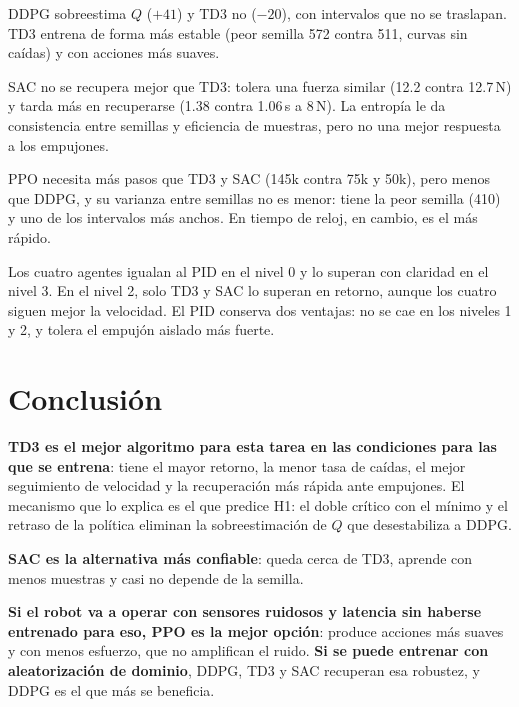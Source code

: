 \documentclass[11pt,a4paper]{article}
\newcommand{\SI}[2]{#1\,#2}  %
\begin{document}
\begin{description}[font=\normalfont\bfseries]
  \item[H1 --- se confirma.] DDPG sobreestima $Q$ ($+41$) y TD3 no ($-20$), con intervalos que no se traslapan. TD3 entrena de forma más estable (peor semilla 572 contra 511, curvas sin caídas) y con acciones más suaves.
  \item[H2 --- se rechaza.] SAC no se recupera mejor que TD3: tolera una fuerza similar (12.2 contra \SI{12.7}{N}) y tarda más en recuperarse (1.38 contra \SI{1.06}{s} a \SI{8}{N}). La entropía le da consistencia entre semillas y eficiencia de muestras, pero no una mejor respuesta a los empujones.
  \item[H3 --- se confirma solo en parte.] PPO necesita más pasos que TD3 y SAC (145k contra 75k y 50k), pero menos que DDPG, y su varianza entre semillas no es menor: tiene la peor semilla (410) y uno de los intervalos más anchos. En tiempo de reloj, en cambio, es el más rápido.
  \item[H4 --- se confirma con matices.] Los cuatro agentes igualan al PID en el nivel 0 y lo superan con claridad en el nivel 3. En el nivel 2, solo TD3 y SAC lo superan en retorno, aunque los cuatro siguen mejor la velocidad. El PID conserva dos ventajas: no se cae en los niveles 1 y 2, y tolera el empujón aislado más fuerte.
\end{description}

\section{Conclusión}

\textbf{TD3 es el mejor algoritmo para esta tarea en las condiciones para las que se entrena}: tiene el mayor retorno, la menor tasa de caídas, el mejor seguimiento de velocidad y la recuperación más rápida ante empujones. El mecanismo que lo explica es el que predice H1: el doble crítico con el mínimo y el retraso de la política eliminan la sobreestimación de $Q$ que desestabiliza a DDPG.

\textbf{SAC es la alternativa más confiable}: queda cerca de TD3, aprende con menos muestras y casi no depende de la semilla.

\textbf{Si el robot va a operar con sensores ruidosos y latencia sin haberse entrenado para eso, PPO es la mejor opción}: produce acciones más suaves y con menos esfuerzo, que no amplifican el ruido. \textbf{Si se puede entrenar con aleatorización de dominio}, DDPG, TD3 y SAC recuperan esa robustez, y DDPG es el que más se beneficia.
\end{document}
